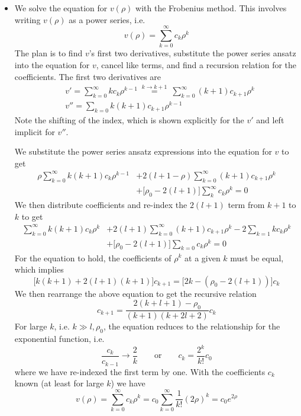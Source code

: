\documentclass[11pt, a4paper]{article}
\newcommand{\eqtext}[1]{\qquad \text{#1} \qquad}
\begin{document}
\begin{itemize}
	\item We solve the equation for $ v(\rho) $ with the Frobenius method. This involves writing $ v(\rho) $ as a power series, i.e.
	\begin{equation*}
		v(\rho) = \sum_{k = 0}^{\infty} c_{k}\rho^{k}
	\end{equation*}
	The plan is to find $ v $'s first two derivatives, substitute the power series ansatz into the equation for $ v $, cancel like terms, and find a recursion relation for the coefficients. The first two derivatives are
	\begin{align*}
		& v' = \sum_{k = 0}^{\infty}kc_{k}\rho^{k-1} \ \stackrel{k\to k+1}{=} \ \sum_{k=0}^{\infty}(k+1)c_{k+1}\rho^{k}\\
		&v'' = \sum_{k = 0} k(k+1)c_{k+1}\rho^{k-1}
	\end{align*}
	Note the shifting of the index, which is shown explicitly for the $ v' $ and left implicit for $ v'' $.
	
	We substitute the power series ansatz expressions into the equation for $ v $ to get
	\begin{align*}
		\rho\sum_{k = 0}^{\infty}k(k+1)c_{k}\rho^{k-1}  &+ 2(l+1-\rho)\sum_{k=0}^{\infty}(k+1)c_{k+1}\rho^{k} \\
		& + \big[\rho_{0} - 2(l+1)\big]\sum_{k}^{\infty} c_{k}\rho^{k} = 0
	\end{align*}
	We then distribute coefficients and re-index the $ 2(l+1) $ term from $ k + 1 $ to $ k $ to get
	\begin{align*}
		\sum_{k = 0}^{\infty}k(k+1)c_{k}\rho^{k}  &+ 2(l+1)\sum_{k=0}^{\infty}(k+1)c_{k+1}\rho^{k} - 2 \sum_{k=1}kc_{k}\rho^{k} \\
		& + \big[\rho_{0} - 2(l+1)\big]\sum_{k=0}c_{k}\rho^{k} = 0
	\end{align*}
	For the equation to hold, the coefficients of $ \rho^{k} $ at a given $ k $ must be equal, which implies 
	\begin{equation*}
		\big[k(k+1) + 2(l+1)(k+1)\big]c_{k+1} = \big[2k - (\rho_{0} - 2(l+1))\big]c_{k}
	\end{equation*}
	We then rearrange the above equation to get the recursive relation
	\begin{equation*}
		c_{k+1} = \frac{2(k+l+1)-\rho_{0}}{(k+1)(k+2l + 2)}c_{k}
	\end{equation*}
	For large $ k $, i.e. $ k \gg l, \rho_{0} $, the equation reduces to the relationship for the exponential function, i.e.
	\begin{equation*}
		\frac{c_{k}}{c_{k-1}} \to \frac{2}{k} \eqtext{or} c_{k} = \frac{2^{k}}{k!}c_{0}
	\end{equation*}
	where we have re-indexed the first term by one. With the coefficients $ c_{k} $ known (at least for large $ k $) we have
	\begin{equation*}
		v(\rho) = \sum_{k = 0}^{\infty}c_{k}\rho^{k} = c_{0}\sum_{k = 0}^{\infty} \frac{1}{k!}(2\rho)^{k} = c_{0}e^{2\rho}
	\end{equation*}
	

\end{itemize}
\end{document}
